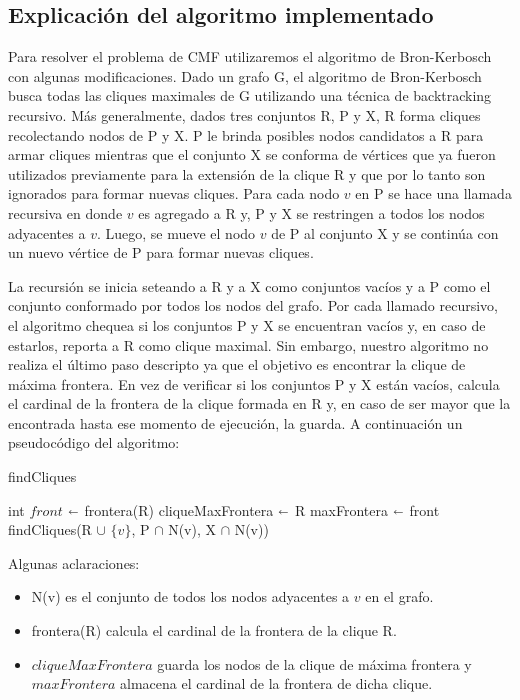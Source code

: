 \subsection{Explicación del algoritmo implementado}

Para resolver el problema de CMF utilizaremos el algoritmo de Bron-Kerbosch con algunas modificaciones. Dado un grafo G, el algoritmo de Bron-Kerbosch busca todas las cliques maximales de G utilizando una técnica de backtracking recursivo. Más generalmente, dados tres conjuntos R, P y X, R forma cliques recolectando nodos de P y X. P le brinda posibles nodos candidatos a R para armar cliques mientras que el conjunto X se conforma de vértices que ya fueron utilizados previamente para la extensión de la clique R y que por lo tanto son ignorados para formar nuevas cliques. Para cada nodo $v$ en P se hace una llamada recursiva en donde $v$ es agregado a R y, P y X se restringen a todos los nodos adyacentes a $v$. Luego, se mueve el nodo $v$ de P al conjunto X y se continúa con un nuevo vértice de P para formar nuevas cliques.

La recursión se inicia seteando a R y a X como conjuntos vacíos y a P como el conjunto conformado por todos los nodos del grafo. Por cada llamado recursivo, el algoritmo chequea si los conjuntos P y X se encuentran vacíos y, en caso de estarlos, reporta a R como clique maximal. Sin embargo, nuestro algoritmo no realiza el último paso descripto ya que el objetivo es encontrar la clique de máxima frontera. En vez de verificar si los conjuntos P y X están vacíos, calcula el cardinal de la frontera de la clique formada en R y, en caso de ser mayor que la encontrada hasta ese momento de ejecución, la guarda. A continuación un pseudocódigo del algoritmo:

\begin{algorithm}[H]
\caption{findCliques}\label{ej1}
\begin{algorithmic}[1]
	\State int $front$ $\shortleftarrow$ frontera(R)
		\State cliqueMaxFrontera $\shortleftarrow$ R
		\State maxFrontera $\shortleftarrow$ front
	\EndIf
		\State findCliques(R $\cup$ $\{v\}$, P $\cap$ N(v), X $\cap$ N(v))
	\EndFor
\EndProcedure
\end{algorithmic}
\end{algorithm}

Algunas aclaraciones:
\begin{itemize}
	\item N(v) es el conjunto de todos los nodos adyacentes a $v$ en el grafo.
	\item frontera(R) calcula el cardinal de la frontera de la clique R.
	\item $cliqueMaxFrontera$ guarda los nodos de la clique de máxima frontera y $maxFrontera$ almacena el cardinal de la frontera de dicha clique.
\end{itemize}

